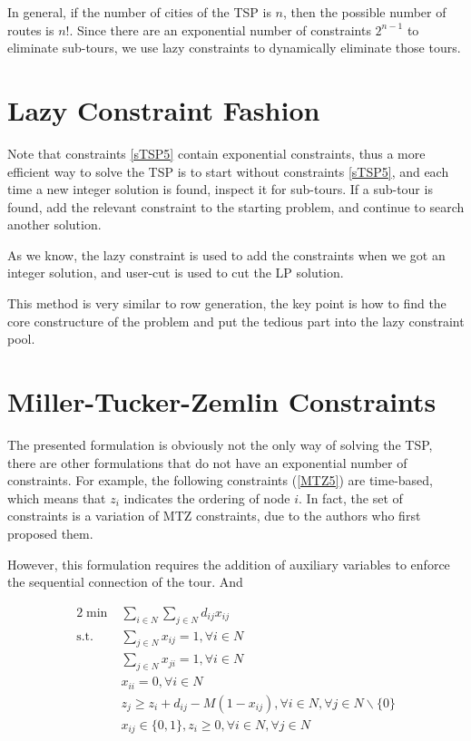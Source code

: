 \documentclass[12pt,letterpaper]{article}
\begin{document}
In general, if the number of cities of the TSP is $n$, then the possible number of routes is $n!$. Since there are an exponential number of constraints $2^{n-1}$ to eliminate sub-tours, we use lazy constraints to dynamically eliminate those tours.

\section{Lazy Constraint Fashion}\label{section-lazy}
Note that constraints \ref{sTSP5} contain exponential constraints, thus a more efficient way to solve the TSP is to start without constraints \ref{sTSP5}, and each time a new integer solution is found, inspect it for sub-tours. If a sub-tour is found, add the relevant constraint to the starting problem, and continue to search another solution.

As we know, the lazy constraint is used to add the constraints when we got an integer solution,
and user-cut is used to cut the LP solution.

This method is very similar to row generation, the key point is how to find the core constructure of the problem and put the tedious part into the lazy constraint pool.
%

\section{Miller-Tucker-Zemlin Constraints}\label{section-other}
The presented formulation is obviously not the only way of solving the TSP, there are other formulations that do not have an exponential number of constraints. For example, the following constraints (\ref{MTZ5}) are time-based, which means that $z_i$ indicates the ordering of node $i$. In fact, the set of constraints is a variation of MTZ constraints, due to the authors who first proposed them.\cite{miller1960integer}

However, this formulation requires the addition of auxiliary variables to enforce the sequential connection of the tour. And

\begin{alignat}{2}
\min & \sum_{i \in N} \sum_{j \in N} d_{i j} x_{i j} \label{obj2} \\
\mbox{s.t.}
&\sum_{j \in N} x_{i j}=1, \forall i \in N \label{MTZ2} \\
&\sum_{j \in N} x_{j i}=1, \forall i \in N \label{MTZ3} \\
&x_{i i}=0, \forall i \in N \label{MTZ4}\\
&z_{j} \geq z_{i}+d_{i j}-M\left(1-x_{i j}\right), \forall i \in N, \forall j \in N \backslash\{0\} \label{MTZ5}\\
& x_{i j} \in\{0,1\}, z_{i} \geq 0, \forall i \in N, \forall j \in N
\end{alignat}
\end{document}
